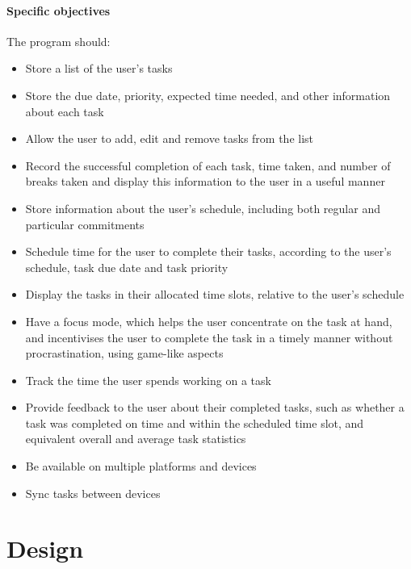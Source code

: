 \documentclass{article}
\begin{document}
\subsection{Specific objectives}
The program should:

\begin{samepage}
	\begin{itemize}
		\item Store a list of the user's tasks
		\item Store the due date, priority, expected time needed, and other information
		      about each task
		\item Allow the user to add, edit and remove tasks from the list
		\item Record the successful completion of each task, time taken, and number of
		      breaks taken and display this information to the user in a useful manner
		\item Store information about the user's schedule,
		      including both regular and particular commitments
		\item Schedule time for the user to complete their tasks, according to the
		      user's schedule, task due date and task priority
		\item Display the tasks in their allocated time slots,
		      relative to the user's schedule
		\item Have a focus mode, which helps the user concentrate on the task at hand,
		      and incentivises the user to complete the task in a timely manner without
		      procrastination, using game-like aspects
		\item Track the time the user spends working on a task
		\item Provide feedback to the user about their completed tasks,
		      such as whether a task was completed on time and within the scheduled time slot,
		      and equivalent overall and average task statistics
		\item Be available on multiple platforms and devices
		\item Sync tasks between devices
	\end{itemize}
\end{samepage}


\part{Design}
\end{document}
